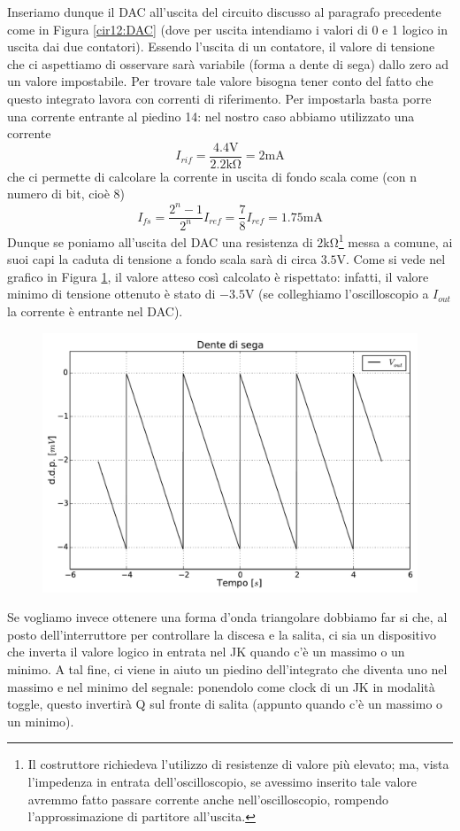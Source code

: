 Inseriamo dunque il DAC all'uscita del circuito discusso al paragrafo precedente come in Figura \ref{cir12:DAC} (dove per uscita intendiamo i valori di 0 e 1 logico in uscita dai due contatori). Essendo l'uscita di un contatore, il valore di tensione che ci aspettiamo di osservare sarà variabile (forma a dente di sega) dallo zero ad un valore impostabile. Per trovare tale valore bisogna tener conto del fatto che questo integrato lavora con correnti di riferimento. Per impostarla basta porre una corrente entrante al piedino 14: nel nostro caso abbiamo utilizzato una corrente
$$I_{rif}=\frac{4.4 \si{\volt}}{2.2\si{\kilo\ohm}} = 2 \si{\milli\ampere}$$
che ci permette di calcolare la corrente in uscita di fondo scala come (con n numero di bit, cioè 8)
$$I_{fs}=\frac{2^n - 1}{2^n} I_{ref} = \frac{7}{8} I_{ref}= 1.75 \si{\milli\ampere}$$
Dunque se poniamo all'uscita del DAC una resistenza di $2 \si{\kilo\ohm}$\footnote{Il costruttore richiedeva l'utilizzo di resistenze di valore più elevato; ma, vista l'impedenza in entrata dell'oscilloscopio, se avessimo inserito tale valore avremmo fatto passare corrente anche nell'oscilloscopio, rompendo l'approssimazione di partitore all'uscita.} messa a comune, ai suoi capi la caduta di tensione a fondo scala sarà di circa $3.5 \si{\volt}$. Come si vede nel grafico in Figura \ref{fig12:sega}, il valore atteso così calcolato è rispettato: infatti, il valore minimo di tensione ottenuto è stato di $-3.5 \si{\volt}$ (se colleghiamo l'oscilloscopio a $I_{out}$ la corrente è entrante nel DAC).

\begin{figure}[htpc]
\centering
	\includegraphics[width=.65\textwidth]{../E12/latex/sega.pdf}
	\caption{}
	\label{fig12:sega}
\end{figure}

Se vogliamo invece ottenere una forma d'onda triangolare dobbiamo far si che, al posto dell'interruttore per controllare la discesa e la salita, ci sia un dispositivo che inverta il valore logico in entrata nel JK quando c'è un massimo o un minimo. A tal fine, ci viene in aiuto un piedino dell'integrato che diventa uno nel massimo e nel minimo del segnale: ponendolo come clock di un JK in modalità toggle, questo invertirà Q sul fronte di salita (appunto quando c'è un massimo o un minimo).

